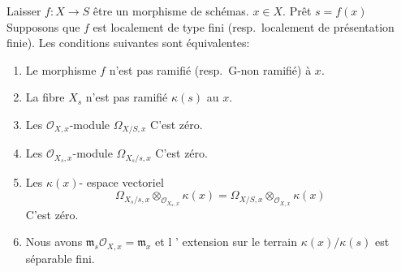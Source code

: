 \begin{lemma}

\label{lemma-unramified-at-point}

Laisser $f : X \to S$ être un morphisme de schémas. $x \in X$. Prêt $s = f(x)$Supposons que $f$ est localement de type fini (resp.\ localement de présentation finie). Les conditions suivantes sont équivalentes:

\begin{enumerate}

\item Le morphisme $f$ n'est pas ramifié (resp.\ G-non ramifié) à $x$.
\item La fibre $X_s$ n'est pas ramifié $\kappa(s)$ au $x$.
\item Les $\mathcal{O}_{X, x}$-module $\Omega_{X/S, x}$ C'est zéro.
\item Les $\mathcal{O}_{X_s, x}$-module $\Omega_{X_s/s, x}$ C'est zéro.
\item Les $\kappa(x)$- espace vectoriel
$$
\Omega_{X_s/s, x} \otimes_{\mathcal{O}_{X_s, x}} \kappa(x) =
\Omega_{X/S, x} \otimes_{\mathcal{O}_{X, x}} \kappa(x)
$$
C'est zéro.
\item Nous avons $\mathfrak m_s\mathcal{O}_{X, x} = \mathfrak m_x$
et l ' extension sur le terrain $\kappa(x)/\kappa(s)$ est séparable fini.

\end{enumerate}

\end{lemma}

